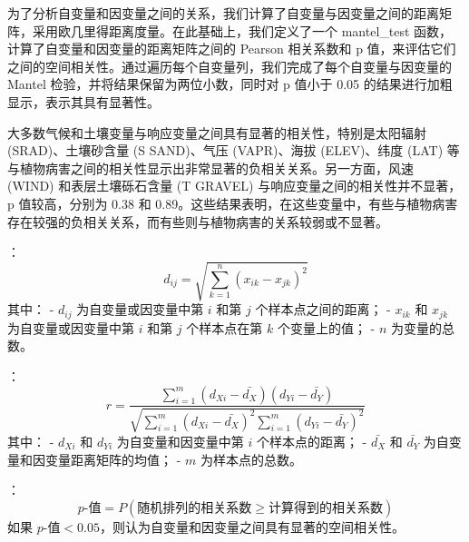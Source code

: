 \documentclass[AutoFakeBold]{LZUThesis-PgD&PhD}
\begin{document}
	为了分析自变量和因变量之间的关系，我们计算了自变量与因变量之间的距离矩阵，采用欧几里得距离度量。在此基础上，我们定义了一个 mantel\_test 函数，计算了自变量和因变量的距离矩阵之间的 Pearson 相关系数和 p 值，来评估它们之间的空间相关性。通过遍历每个自变量列，我们完成了每个自变量与因变量的 Mantel 检验，并将结果保留为两位小数，同时对 p 值小于 0.05 的结果进行加粗显示，表示其具有显著性。
	
	大多数气候和土壤变量与响应变量之间具有显著的相关性，特别是太阳辐射 (SRAD)、土壤砂含量 (S SAND)、气压 (VAPR)、海拔 (ELEV)、纬度 (LAT) 等与植物病害之间的相关性显示出非常显著的负相关关系。另一方面，风速 (WIND) 和表层土壤砾石含量 (T GRAVEL) 与响应变量之间的相关性并不显著，p 值较高，分别为 0.38 和 0.89。这些结果表明，在这些变量中，有些与植物病害存在较强的负相关关系，而有些则与植物病害的关系较弱或不显著。
	
	
	：
	\[
	d_{ij} = \sqrt{\sum_{k=1}^{n} (x_{ik} - x_{jk})^2}
	\]
	其中：
	- \( d_{ij} \) 为自变量或因变量中第 \(i\) 和第 \(j\) 个样本点之间的距离；
	- \( x_{ik} \) 和 \( x_{jk} \) 为自变量或因变量中第 \(i\) 和第 \(j\) 个样本点在第 \(k\) 个变量上的值；
	- \( n \) 为变量的总数。
	
	：
	\[
	r = \frac{\sum_{i=1}^{m} (d_{Xi} - \bar{d_X})(d_{Yi} - \bar{d_Y})}{\sqrt{\sum_{i=1}^{m} (d_{Xi} - \bar{d_X})^2 \sum_{i=1}^{m} (d_{Yi} - \bar{d_Y})^2}}
	\]
	其中：
	- \( d_{Xi} \) 和 \( d_{Yi} \) 为自变量和因变量中第 \(i\) 个样本点的距离；
	- \( \bar{d_X} \) 和 \( \bar{d_Y} \) 为自变量和因变量距离矩阵的均值；
	- \( m \) 为样本点的总数。
	
	：
	\[
	p\text{-值} = P(\text{随机排列的相关系数} \geq \text{计算得到的相关系数})
	\]
	如果 \( p\text{-值} < 0.05 \)，则认为自变量和因变量之间具有显著的空间相关性。
	
\end{document}
